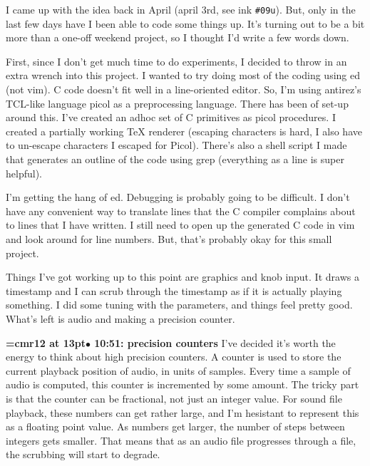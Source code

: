 I came up with the idea back in April (april 3rd, see ink {\tt \#09u}). But, only in the last few days have I been able to code some things up. It's turning out to be a bit more than a one-off weekend project, so I thought I'd write a few words down.
\par

First, since I don't get much time to do experiments, I decided to throw in an extra wrench into this project. I wanted to try doing most of the coding using ed (not vim). C code doesn't fit well in a line-oriented editor. So, I'm using antirez's TCL-like language picol as a preprocessing language. There has been of set-up around this. I've created an adhoc set of C primitives as picol procedures. I created a partially working TeX renderer (escaping characters is hard, I also have to un-escape characters I escaped for Picol). There's also a shell script I made that generates an outline of the code using grep (everything as a line is super helpful).
\par

I'm getting the hang of ed. Debugging is probably going to be difficult. I don't have any convenient way to translate lines that the C compiler complains about to lines that I have written. I still need to open up the generated C code in vim and look around for line numbers. But, that's probably okay for this small project.
\par

Things I've got working up to this point are graphics and knob input. It draws a timestamp and I can scrub through the timestamp as if it is actually playing something. I did some tuning with the parameters, and things feel pretty good. What's left is audio and making a precision counter.
\par

{\smallskip\noindent\bf\font\titlefont=cmr12 at 13pt\titlefont $\bullet$ 10:51: precision counters}\smallskip
I've decided it's worth the energy to think about high precision counters. A counter is used to store the current playback position of audio, in units of samples. Every time a sample of audio is computed, this counter is incremented by some amount. The tricky part is that the counter can be fractional, not just an integer value. For sound file playback, these numbers can get rather large, and I'm hesistant to represent this as a floating point value. As numbers get larger, the number of steps between integers gets smaller. That means that as an audio file progresses through a file, the scrubbing will start to degrade.
\par

